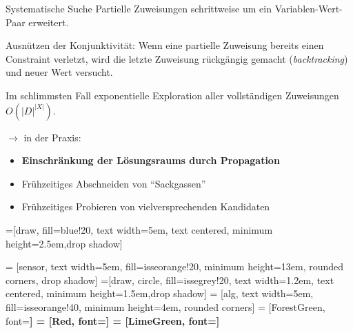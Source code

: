 \documentclass[10pt,xcolor={dvipsnames},fleqn]{beamer}
\begin{document}
\begin{frame}{Systematische Suche}
Partielle Zuweisungen schrittweise um ein Variablen-Wert-Paar erweitert.

\vspace*{2ex}

Ausnützen der Konjunktivität: Wenn eine partielle Zuweisung bereits \alert{einen} Constraint verletzt, wird die
letzte Zuweisung \alert{rückgängig} gemacht (\emph{backtracking}) und neuer Wert versucht.

\vspace*{2ex}

Im schlimmsten Fall exponentielle Exploration aller vollständigen Zuweisungen $O(|D|^{|X|})$.

\vspace*{1ex}

$\rightarrow$ in der Praxis: 

\begin{itemize}
\item \textbf{Einschränkung der Lösungsraums durch \alert{Propagation}}
\item Frühzeitiges Abschneiden von ``\alert{Sackgassen}''
\item Frühzeitiges Probieren von \alert{vielversprechenden} Kandidaten
\end{itemize}
\end{frame}

=[draw, fill=blue!20, text width=5em, 
    text centered, minimum height=2.5em,drop shadow]    
    
 = [sensor, text width=5em, fill=isseorange!20, 
    minimum height=13em, rounded corners, drop shadow]
=[draw, circle, fill=issegrey!20, text width=1.2em, 
    text centered, minimum height=1.5em,drop shadow]
 = [alg, text width=5em, fill=isseorange!40, 
    minimum height=4em, rounded corners]
 = [ForestGreen, font=\bfseries]
 = [Red, font=\bfseries]
 = [LimeGreen, font=\bfseries]
        

\end{document}
